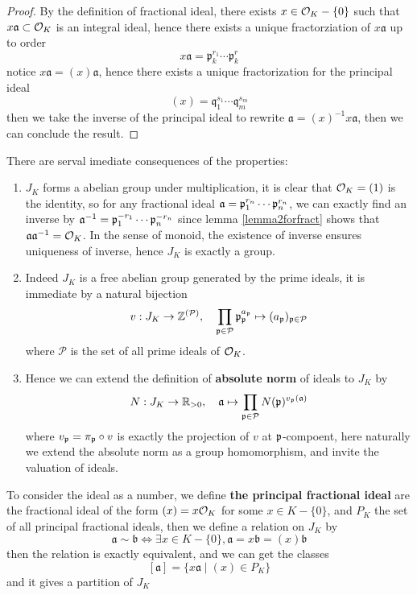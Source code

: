 \begin{proof}
    By the definition of fractional ideal, there exists \(x \in \mathcal{O}_K-\{0\}\) such that \(x\mathfrak{a} \subset \mathcal{O}_K\) is an integral ideal, hence there exists a unique fractorziation of \(x\mathfrak{a}\) up to order
    \[x\mathfrak{a} = \mathfrak{p}_k^{r_1} \cdots \mathfrak{p}_k^{r}\]
    notice \(x\mathfrak{a} = (x) \mathfrak{a}\), hence there exists a unique fractorization for the principal ideal
    \[(x) = \mathfrak{q}_1^{s_1} \cdots \mathfrak{q}_m^{s_m}\]
    then we take the inverse of the principal ideal to rewrite \(\mathfrak{a} = (x)^{-1} x\mathfrak{a}\), then we can conclude the result.
\end{proof}

\begin{remark}
    There are serval imediate consequences of the properties:
    \begin{enumerate}
        \item \(J_K\) forms a abelian group under multiplication, it is clear that \(\mathcal{O}_K=(1)\) is the identity, so for any fractional ideal \(\mathfrak{a} = \mathfrak{p}_1^{r_n} \cdots \mathfrak{p}_n^{r_n}\), we can exactly find an inverse by \(\mathfrak{a}^{-1} = \mathfrak{p}_1^{-r_1} \cdots \mathfrak{p}_n^{-r_n}\) since lemma \ref{lemma2forfract} shows that \(\mathfrak{a}\mathfrak{a}^{-1} = \mathcal{O}_K\). In the sense of monoid, the existence of inverse ensures uniqueness of inverse, hence \(J_K\) is exactly a group.
        \item Indeed \(J_K\) is a free abelian group generated by the prime ideals, it is immediate by a natural bijection
        \[v:  J_K \to \mathbb{Z}^{(\mathcal{P})}  , \quad \prod_{\mathfrak{p} \in \mathcal{P}} \mathfrak{p}_{\mathfrak{p}}^{a_{\mathfrak{p}}} \mapsto  (a_{\mathfrak{p}})_{\mathfrak{p} \in \mathcal{P}} \]
        where \(\mathcal{P}\) is the set of all prime ideals of \(\mathcal{O}_K\).
        \item Hence we can extend the definition of \textbf{absolute norm} of ideals to \(J_K\) by
        \[N: J_K \to \mathbb{R}_{>0}, \quad \mathfrak{a} \mapsto \prod_{\mathfrak{p} \in \mathcal{P}} N(\mathfrak{p})^{v_{\mathfrak{p}}(\mathfrak{a})}\]
        where \(v_{\mathfrak{p}} = \pi_{\mathfrak{p}} \circ v\) is exactly the projection of \(v\) at \(\mathfrak{p}\)-compoent, here naturally we extend the absolute norm as a group homomorphism, and invite the valuation of ideals.
    \end{enumerate}
\end{remark}


     To consider the ideal as a number, we define \textbf{the principal fractional ideal} are the fractional ideal of the form \((x) = x \mathcal{O}_K\) for some \(x \in K-\{0\}\), and \(P_K\) the set of all principal fractional ideals, then we define a relation on \(J_K\) by
        \[\mathfrak{a} \sim \mathfrak{b} \iff \exists x \in K-\{0\}, \mathfrak{a} = x\mathfrak{b} = (x)\mathfrak{b}\]
        then the relation is exactly equivalent, and we can get the classes
        \[[\mathfrak{a}] = \{x\mathfrak{a} \mid (x) \in P_K\}\]
        and it gives a partition of \(J_K\) 

